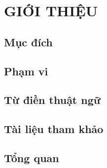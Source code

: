 \chapter{GIỚI THIỆU}

\section{Mục đích}

\section{Phạm vi}

\section{Từ điền thuật ngữ}

\section{Tài liệu tham khảo}

\section{Tổng quan}
